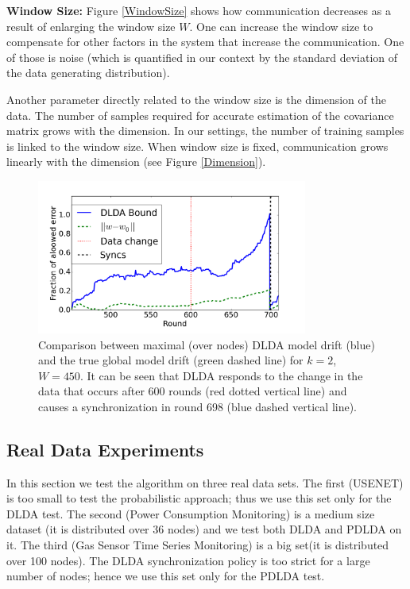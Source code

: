 \noindent\textbf{Window Size:}
Figure \ref{WindowSize} shows how communication decreases as a result
of enlarging the window size $W$.  One can increase the window size to compensate for other factors in the system that increase the communication. One of those is
noise (which is quantified in our context by the standard deviation of the
data generating distribution).


Another parameter directly related to the window size is the dimension of the data. The number of samples required for accurate estimation of the covariance matrix grows with the dimension. In our settings, the number of training samples is linked to the window size. When window size is fixed, communication grows linearly with the dimension (see Figure \ref{Dimension}).



\begin{figure}
	\centering
	\includegraphics[width=3.5in,height=2in]{graphics/LDA/DriftDetected.png}
	\caption{Comparison between maximal (over nodes) DLDA model drift (blue)
	and the true global model drift (green dashed line) for $k=2$, $W=450$.
	It can be seen that DLDA responds to the change in the data that occurs
	after 600 rounds (red dotted vertical line) and causes a synchronization in round 698 (blue dashed vertical line).}
	\label{usenet}
	\end{figure}
\subsection{Real Data Experiments}
In this section we test the algorithm on three real data sets. The first
(USENET) is too small to test the probabilistic approach; thus we use this set only for the DLDA test.
The second (Power Consumption Monitoring) is a medium size dataset (it
is distributed over 36 nodes) and we test both DLDA and PDLDA on it.
The third (Gas Sensor Time Series Monitoring) is a big set(it is distributed over
100 nodes). The DLDA synchronization policy is too strict for a large number of nodes; hence we use this set only for the PDLDA test.

